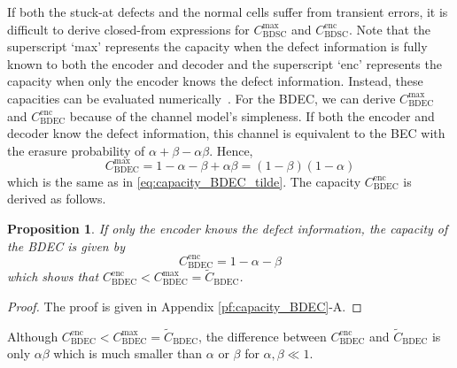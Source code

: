 \documentclass[10pt,twocolumn,twoside,submit]{JCNtran}
\newtheorem{proposition}[theorem]{Proposition}
\begin{document}
	If both the stuck-at defects and the normal cells suffer from transient errors, it is difficult to derive closed-from expressions for $C_{\text{BDSC}}^{\text{max}}$ and $C_{\text{BDSC}}^{\text{enc}}$. Note that the superscript `max' represents the capacity when the defect information is fully known to both the encoder and decoder and the superscript `enc' represents the capacity when only the encoder knows the defect information. Instead, these capacities can be evaluated numerically~\cite{Heegard1983capacity}. For the BDEC, we can derive $C_{\text{BDEC}}^{\text{max}}$ and $C_{\text{BDEC}}^{\text{enc}}$ because of the channel model's simpleness. If both the encoder and decoder know the defect information, this channel is equivalent to the BEC with the erasure probability of $\alpha + \beta - \alpha \beta$. Hence, 
	\begin{equation}
	    C_{\text{BDEC}}^{\text{max}} = 1 - \alpha - \beta + \alpha \beta = (1 - \beta)(1 - \alpha)
	\end{equation}
	which is the same as in \eqref{eq:capacity_BDEC_tilde}. The capacity $C_{\text{BDEC}}^{\text{enc}}$ is derived as follows. 
	\begin{proposition} \label{thm:capacity_BDEC}
		If only the encoder knows the defect information, the capacity of the BDEC is given by
		\begin{equation} \label{eq:capacity_BDEC}
			C_{\text{BDEC}}^{\text{enc}} = 1 - \alpha - \beta
		\end{equation}
		which shows that $C_{\text{BDEC}}^{\text{enc}} < C_{\text{BDEC}}^{\text{max}} = \widetilde{C}_{\text{BDEC}}$.
	\end{proposition}
	\begin{proof}
		The proof is given in Appendix \ref{pf:capacity_BDEC}-A. 
	\end{proof}	
	Although $C_{\text{BDEC}}^{\text{enc}} < C_{\text{BDEC}}^{\text{max}} = \widetilde{C}_{\text{BDEC}}$, the difference between $C_{\text{BDEC}}^{\text{enc}}$ and $\widetilde{C}_{\text{BDEC}}$ is only $\alpha \beta$ which is much smaller than $\alpha$ or $\beta$ for $\alpha, \beta \ll 1$. 
	
\end{document}
